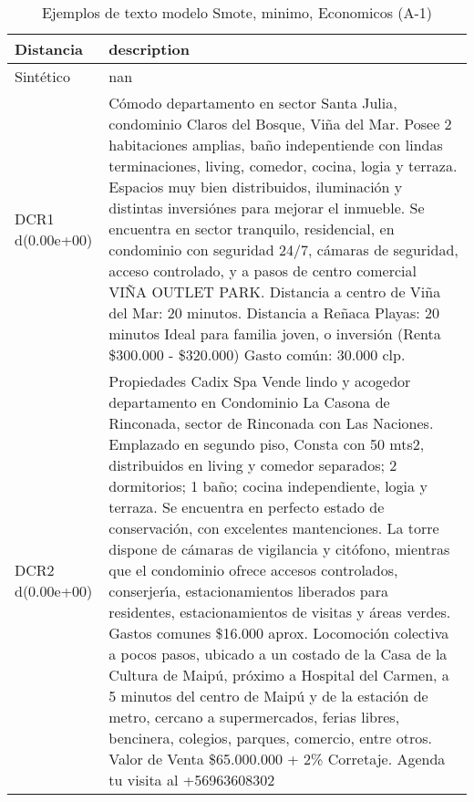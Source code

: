 \begin{table}[H]
\centering
\fontsize{10}{14}\selectfont
\caption{Ejemplos de texto modelo Smote, minimo, Economicos (A-1)}
\label{table-example-economicos-a-1-smote-enc-min-text}
\begin{tabular}{|l|m{35em}|}
\hline
\rowcolor[gray]{0.8}
Distancia & description \\
\hline Sintético & nan \\
\hline DCR1 d(0.00e+00) & C\'omodo departamento en sector Santa Julia, condominio Claros del Bosque, Vi\~na del Mar. Posee 2 habitaciones amplias, ba\~no indepentiende con lindas terminaciones, living, comedor, cocina, logia y terraza. Espacios muy bien distribuidos, iluminaci\'on y distintas inversi\'ones para mejorar el inmueble. Se encuentra en sector tranquilo, residencial, en condominio con seguridad 24/7, c\'amaras de seguridad, acceso controlado, y a pasos de centro comercial VI\~NA OUTLET PARK. Distancia a centro de Vi\~na del Mar: 20 minutos. Distancia a Re\~naca Playas: 20 minutos Ideal para familia joven, o inversi\'on (Renta \$300.000 - \$320.000) Gasto com\'un: 30.000 clp. \\
\hline DCR2 d(0.00e+00) & Propiedades Cadix Spa Vende lindo y acogedor departamento en Condominio La Casona de Rinconada, sector de Rinconada con Las Naciones. Emplazado en segundo piso, Consta con 50 mts2, distribuidos en living y comedor separados; 2 dormitorios; 1 ba\~no; cocina independiente, logia y terraza. Se encuentra en perfecto estado de conservaci\'on, con excelentes mantenciones. La torre dispone de c\'amaras de vigilancia y cit\'ofono, mientras que el condominio ofrece accesos controlados, conserjer{\'\i}a, estacionamientos liberados para residentes, estacionamientos de visitas y \'areas verdes. Gastos comunes \$16.000 aprox. 
Locomoci\'on colectiva a pocos pasos, ubicado a un costado de la Casa de la Cultura de Maip\'u, pr\'oximo a Hospital del Carmen, a 5 minutos del centro de Maip\'u y de la estaci\'on de metro, cercano a supermercados, ferias libres, bencinera, colegios, parques, comercio, entre otros.
Valor de Venta \$65.000.000 + 2\% Corretaje. Agenda tu visita al +56963608302 \\
\hline
\end{tabular}
\end{table}
